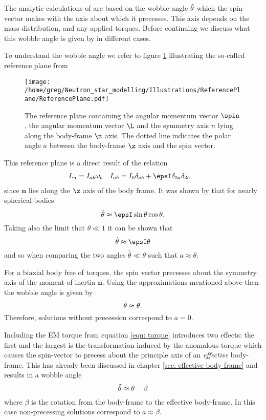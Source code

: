 The analytic calculations of \citet{Jones2001} are based on the wobble angle 
$\tilde{\theta}$ which the spin-vector makes with the axis about which it precesses.
This axis depends on the mass distribution, and any applied torques. Before
continuing we discuss what this wobble angle is given by in different cases.

To understand the wobble angle we refer to figure \ref{fig: reference plane}
illustrating the so-called reference plane from \citet{Jones2001}
\begin{figure}
    \texttt{[image: /home/greg/Neutron\_star\_modelling/Illustrations/ReferencePlane/ReferencePlane.pdf]}
    \caption{The reference plane containing the angular momentum vector $\spin$,
    the angular momentum vector $\L$ and the symmetry axis $n$ lying along the
    body-frame $\z$ axis. The dotted line indicates the polar angle $a$ between
    the body-frame $\z$ axis and the spin vector.}
    \label{fig: reference plane}
\end{figure}
This reference plane is a direct result of the relation 
\begin{align}
    L_{a} = I_{ab} \omega_{b} &&& I_{ab} = I_{0} \delta_{ab} + \epsI\delta_{3a}\delta_{3b}
\end{align}
since $\mathbf{n}$ lies along the $\z$ axis of the body frame. It was shown by
\citet{Jones2001} that for nearly spherical bodies
\begin{equation}
    \hat{\theta} \approx \epsI \sin\theta \cos\theta.
\end{equation}
Taking also the limit that $\theta \ll 1$ it can be shown that
\begin{equation}
    \hat{\theta} \approx \epsI \theta
\end{equation}
and so when comparing the two angles $\hat{\theta} \ll \theta$ such that 
$a\approx \theta$.

For a biaxial body free of torques, the spin vector precesses about the
symmetry axis of the moment of inertia $\mathbf{n}$. Using the approximations
mentioned above then the wobble angle is given by
\begin{equation}
    \tilde{\theta} \approx \theta.
\end{equation}
Therefore, solutions without precession correspond to $a=0$.

Including the EM torque from equation \eqref{eqn: torque} introduces two effects:
the first and the largest is the transformation induced by the anomalous torque
which causes the spin-vector to precess about the principle axis of an
\emph{effective} body-frame. This has already been discussed in chapter \ref{sec:
effective body frame} and results in a wobble angle
\begin{equation}
    \tilde{\theta} \approx \theta - \beta
    \label{eqn: wobble angle no SD}
\end{equation}
where $\beta$ is the rotation from the body-frame to the effective body-frame.
In this case non-precessing solutions correspond to $a \approx \beta$.

